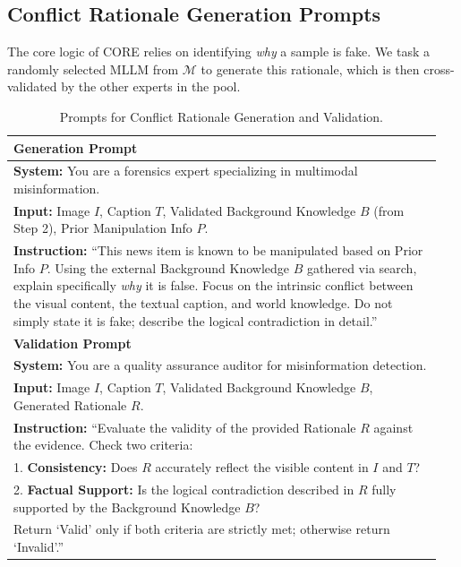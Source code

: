 \documentclass{article}
\theoremstyle{plain}
\theoremstyle{definition}
\theoremstyle{remark}
\begin{document}
\subsection{Conflict Rationale Generation Prompts}
The core logic of CORE relies on identifying \textit{why} a sample is fake. We task a randomly selected MLLM from $\mathcal{M}$ to generate this rationale, which is then cross-validated by the other experts in the pool.

\begin{table}[H]
    \centering
    \caption{Prompts for Conflict Rationale Generation and Validation.}
    \label{tab:prompt_rationale}
    \begin{tabular}{p{0.95\linewidth}}
        \toprule
        \textbf{Generation Prompt} \\
        \midrule
        \textbf{System:} You are a forensics expert specializing in multimodal misinformation. \\
        \textbf{Input:} Image $I$, Caption $T$, Validated Background Knowledge $B$ (from Step 2), Prior Manipulation Info $P$. \\
        \textbf{Instruction:} ``This news item is known to be manipulated based on Prior Info $P$. Using the external Background Knowledge $B$ gathered via search, explain specifically \textit{why} it is false. Focus on the intrinsic conflict between the visual content, the textual caption, and world knowledge. Do not simply state it is fake; describe the logical contradiction in detail.'' \\
        \midrule
        \textbf{Validation Prompt} \\
        \midrule
        \textbf{System:} You are a quality assurance auditor for misinformation detection. \\
        \textbf{Input:} Image $I$, Caption $T$, Validated Background Knowledge $B$, Generated Rationale $R$. \\
        \textbf{Instruction:} ``Evaluate the validity of the provided Rationale $R$ against the evidence. Check two criteria: \\
        1. \textbf{Consistency:} Does $R$ accurately reflect the visible content in $I$ and $T$? \\
        2. \textbf{Factual Support:} Is the logical contradiction described in $R$ fully supported by the Background Knowledge $B$? \\
        Return `Valid' only if both criteria are strictly met; otherwise return `Invalid'.'' \\
        \bottomrule
    \end{tabular}
\end{table}
\end{document}
